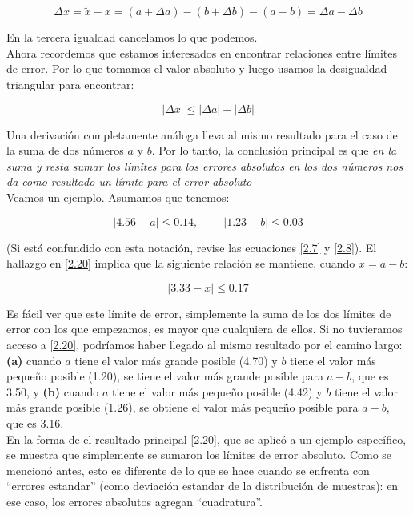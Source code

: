 \documentclass[11pt]{article}
\begin{document}
\[
\begin{equation}
\Delta x = \tilde{x} - x = (a + \Delta a) - (b + \Delta b) - (a - b) = \Delta a - \Delta b \label{2.19}\tag{16}
\end{equation}
\]

En la tercera igualdad cancelamos lo que podemos.\\
Ahora recordemos que estamos interesados en encontrar relaciones entre
límites de error. Por lo que tomamos el valor absoluto y luego usamos la
desigualdad triangular para encontrar:

\[
\begin{equation}
|\Delta x | \leq |\Delta a| + |\Delta b| \label{2.20}\tag{17}
\end{equation}
\]

Una derivación completamente análoga lleva al mismo resultado para el
caso de la suma de dos números \(a\) y \(b\). Por lo tanto, la
conclusión principal es que \emph{en la suma y resta sumar los límites
para los errores absolutos en los dos números nos da como resultado un
límite para el error absoluto}\\
Veamos un ejemplo. Asumamos que tenemos:

\[
\begin{equation}
|4.56 - a| \leq 0.14, \ \ \ \ \ \ \ \ \ \ |1.23 - b| \leq 0.03 \label{2.21}\tag{18}
\end{equation}
\]

(Si está confundido con esta notación, revise las ecuaciones \eqref{2.7}
y \eqref{2.8}). El hallazgo en \eqref{2.20} implica que la siguiente
relación se mantiene, cuando \(x = a - b\):

\[
\begin{equation}
|3.33 - x| \leq 0.17 \label{2.22}\tag{19}
\end{equation}
\]

Es fácil ver que este límite de error, simplemente la suma de los dos
límites de error con los que empezamos, es mayor que cualquiera de
ellos. Si no tuvieramos acceso a \eqref{2.20}, podríamos haber llegado
al mismo resultado por el camino largo: \textbf{(a)} cuando \(a\) tiene
el valor más grande posible (4.70) y \(b\) tiene el valor más pequeño
posible (1.20), se tiene el valor más grande posible para \(a - b\), que
es 3.50, y \textbf{(b)} cuando \(a\) tiene el valor más pequeño posible
(4.42) y \(b\) tiene el valor más grande posible (1.26), se obtiene el
valor más pequeño posible para \(a - b\), que es 3.16.\\
En la forma de el resultado principal \eqref{2.20}, que se aplicó a un
ejemplo específico, se muestra que simplemente se sumaron los límites de
error absoluto. Como se mencionó antes, esto es diferente de lo que se
hace cuando se enfrenta con ``errores estandar'' (como deviación
estandar de la distribución de muestras): en ese caso, los errores
absolutos agregan ``cuadratura''.
\end{document}
